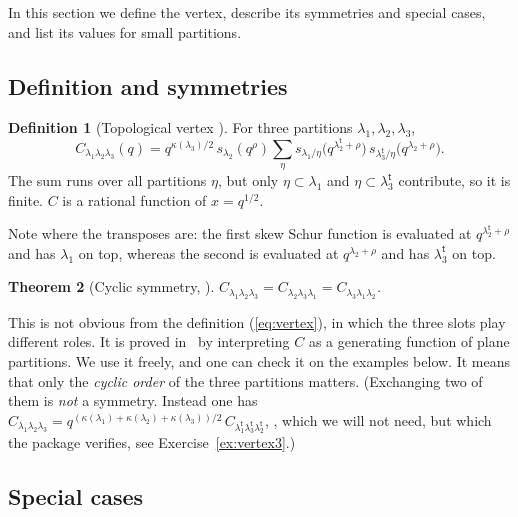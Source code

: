 \documentclass[11pt]{article}
\theoremstyle{plain}
\newtheorem{theorem}{Theorem}[section]
\theoremstyle{definition}
\newtheorem{definition}[theorem]{Definition}
\theoremstyle{remark}
\newcommand{\qrho}{q^{\rho}}
\newcommand{\tr}{{\mathsf t}}
\newcommand{\lt}[1]{#1^{\tr}}
\begin{document}
In this section we define the vertex, describe its symmetries and special cases, and list its
values for small partitions.

\subsection{Definition and symmetries}

\begin{definition}[Topological vertex {\cite[Def.~2.2]{Kon}}]\label{def:vertex}
For three partitions $\lambda_1,\lambda_2,\lambda_3$,
\begin{equation}\label{eq:vertex}
C_{\lambda_1\lambda_2\lambda_3}(q)=q^{\kappa(\lambda_3)/2}\,s_{\lambda_2}(\qrho)
\sum_{\eta}s_{\lambda_1/\eta}\big(q^{\lt\lambda_2+\rho}\big)\,
s_{\lt\lambda_3/\eta}\big(q^{\lambda_2+\rho}\big).
\end{equation}
The sum runs over all partitions $\eta$, but only $\eta\subset\lambda_1$ and $\eta\subset\lt\lambda_3$
contribute, so it is finite. $C$ is a rational function of $x=q^{1/2}$.
\end{definition}

Note where the transposes are: the first skew Schur function is evaluated at $q^{\lt\lambda_2+\rho}$
and has $\lambda_1$ on top, whereas the second is evaluated at $q^{\lambda_2+\rho}$ and has $\lt\lambda_3$
on top.

\begin{theorem}[Cyclic symmetry, {\cite{ORV}}]\label{thm:cyclic}
$C_{\lambda_1\lambda_2\lambda_3}=C_{\lambda_2\lambda_3\lambda_1}=C_{\lambda_3\lambda_1\lambda_2}$.
\end{theorem}

This is not obvious from the definition (\ref{eq:vertex}), in which the three slots play
different roles. It is proved
in~\cite{ORV} by interpreting $C$ as a generating function of plane partitions. We use it freely,
and one can check it on the examples below. It means that only the \textit{cyclic order} of the
three partitions matters. (Exchanging two of them is \textit{not} a symmetry. Instead one has
$C_{\lambda_1\lambda_2\lambda_3}=q^{(\kappa(\lambda_1)+\kappa(\lambda_2)+\kappa(\lambda_3))/2}\,
C_{\lt\lambda_1\lt\lambda_3\lt\lambda_2}$, \cite[(3.12)]{AKMV}, which we will not need, but
which the package verifies, see Exercise~\ref{ex:vertex3}.)

\subsection{Special cases}
\end{document}
